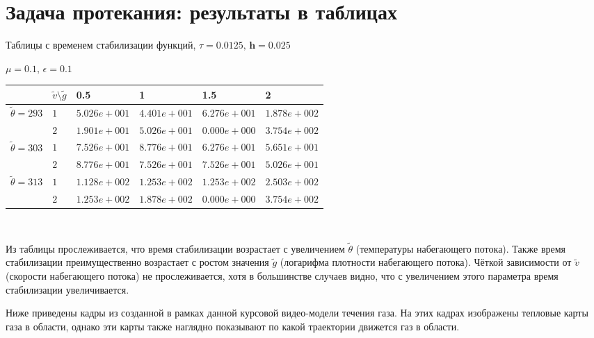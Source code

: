 \documentclass[a4paper]{article}
\theoremstyle{definition}
\numberwithin{equation}{section}
\begin{document}
\section{Задача протекания: результаты в таблицах}
\begin{center}
Таблицы с временем стабилизации функций, $\tau=0.0125, \, \textbf{h}=0.025$

$\mu=0.1, \, \epsilon=0.1$
\\[2.0ex]  

\begin{tabular}{|p{0.8in}|p{0.6in}|p{1.0in}|p{1.0in}|p{1.0in}|p{1.0in}|} \hline
\multirow{1}{*}{} & $\tilde{v}\setminus \tilde{g} $ & 0.5 & 1 & 1.5 & 2\\ \hline
\multirow{2}{*}{$\tilde{\theta}=293$} & $1$& $5.026e+001$ &$4.401e+001$ &$6.276e+001$ &$1.878e+002$ \\ \cline{2-6}
& $2$& $1.901e+001$ &$5.026e+001$ &$0.000e+000$ &$3.754e+002$  \\ \hline
\multirow{2}{*}{$\tilde{\theta}=303$} & $1$& $7.526e+001$ &$8.776e+001$ &$6.276e+001$ &$5.651e+001$ \\ \cline{2-6}
& $2$& $8.776e+001$ &$7.526e+001$ &$7.526e+001$ &$5.026e+001$  \\ \hline
\multirow{2}{*}{$\tilde{\theta}=313$} & $1$& $1.128e+002$ &$1.253e+002$ &$1.253e+002$ &$2.503e+002$ \\ \cline{2-6}
& $2$& $1.253e+002$ &$1.878e+002$ &$0.000e+000$ &$3.754e+002$  \\ \hline

\end{tabular}\\[20pt]

\end{center}

Из таблицы прослеживается, что время стабилизации возрастает с увеличением $\tilde{\theta}$ (температуры набегающего потока). Также время стабилизации преимущественно возрастает с ростом значения $\tilde{g}$ (логарифма плотности набегающего потока). Чёткой зависимости от $\tilde{v}$ (скорости набегающего потока) не прослеживается, хотя в большинстве случаев видно, что с увеличением этого параметра время стабилизации увеличивается.

\newpage
Ниже приведены кадры из созданной в рамках данной курсовой видео-модели течения газа. На этих кадрах изображены тепловые карты газа в области, однако эти карты также наглядно показывают по какой траектории движется газ в области.
\begin{center}
\\
\\
\end{center}
\begin{center}
\\
\\
\\
\end{center}
\end{document}
